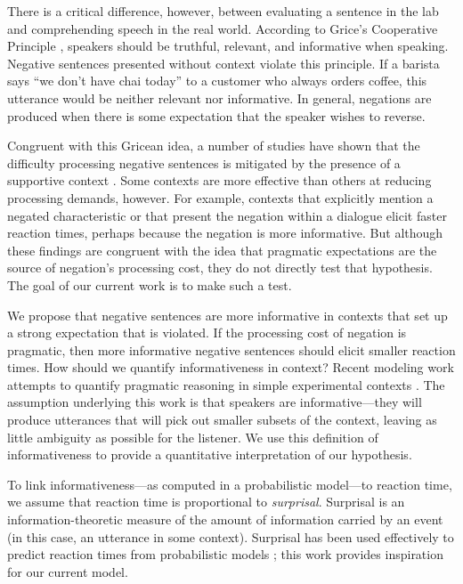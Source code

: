 \documentclass[10pt,letterpaper]{article}
\begin{document}
There is a critical difference, however, between evaluating a sentence in the lab and comprehending speech in the real world. According to Grice's Cooperative Principle \cite{grice1975}, speakers should be truthful, relevant, and informative when speaking.  Negative sentences presented without context violate this principle.  If a barista says ``we don't have chai today'' to a customer who always orders coffee, this utterance would be neither relevant nor informative.  In general, negations are produced when there is some expectation that the speaker wishes to reverse.  

Congruent with this Gricean idea, a number of studies have shown that the difficulty processing negative sentences is mitigated by the presence of a supportive context \cite{wason1965, glenberg1999, ludtke2006, nieuwland2008, dale2011}. Some contexts are more effective than others at reducing processing demands, however. For example, contexts that explicitly mention a negated characteristic \cite{ludtke2006} or that present the negation within a dialogue \cite{dale2011} elicit faster reaction times, perhaps because the negation is more informative. But although these findings are congruent with the idea that pragmatic expectations are the source of negation's processing cost, they do not directly test that hypothesis.  The goal of our current work is to make such a test.

We propose that negative sentences are more informative in contexts that set up a strong expectation that is violated. If the processing cost of negation is pragmatic, then more informative negative sentences should elicit smaller reaction times. How should we quantify informativeness in context? Recent modeling work attempts to quantify pragmatic reasoning in simple experimental contexts \cite{frank2012,goodman2013}. The assumption underlying this work is that speakers are informative---they will produce utterances that will pick out smaller subsets of the context, leaving as little ambiguity as possible for the listener.  We use this definition of informativeness to provide a quantitative interpretation of our hypothesis.

To link informativeness---as computed in a probabilistic model---to reaction time, we assume that reaction time is proportional to \emph{surprisal}. Surprisal is an information-theoretic measure of the amount of information carried by an event (in this case, an utterance in some context). Surprisal has been used effectively to predict reaction times from probabilistic models \cite{levy2008}; this work provides inspiration for our current model. 
\end{document}
